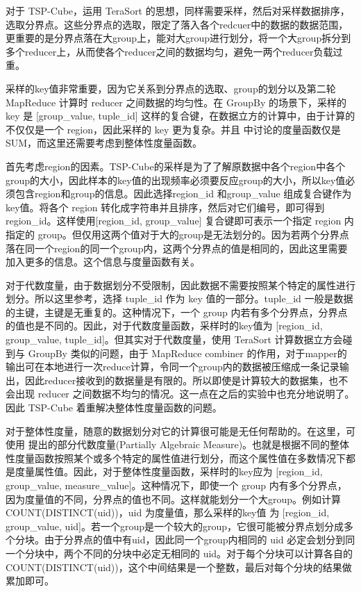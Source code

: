 对于 TSP-Cube，运用 TeraSort 的思想，同样需要采样，然后对采样数据排序，选取分界点。这些分界点的选取，限定了落入各个redcuer中的数据的数据范围，更重要的是分界点落在大group上，能对大group进行划分，将一个大group拆分到多个reducer上，从而使各个reducer之间的数据均匀，避免一两个reducer负载过重。

采样的key值非常重要，因为它关系到分界点的选取、group的划分以及第二轮 MapReduce 计算时 reducer 之间数据的均匀性。在 GroupBy 的场景下，采样的 key 是 [group\_value, tuple\_id] 这样的复合键，在数据立方的计算中，由于计算的不仅仅是一个 region，因此采样的 key 更为复杂。并且\cite{tao2013minimal} 中讨论的度量函数仅是 SUM，而这里还需要考虑到整体性度量函数。

首先考虑region的因素。TSP-Cube的采样是为了了解原数据中各个region中各个group的大小，因此样本的key值的出现频率必须要反应group的大小，所以key值必须包含region和group的信息。因此选择region\_id 和group\_value 组成复合键作为key值。将各个 region 转化成字符串并且排序，然后对它们编号，即可得到 region\_id。这样使用[region\_id, group\_value] 复合键即可表示一个指定 region 内指定的 group。但仅用这两个值对于大的group是无法划分的。因为若两个分界点落在同一个region的同一个group内，这两个分界点的值是相同的，因此这里需要加入更多的信息。这个信息与度量函数有关。

对于代数度量，由于数据划分不受限制，因此数据不需要按照某个特定的属性进行划分。所以这里参考\cite{tao2013minimal}，选择 tuple\_id 作为 key 值的一部分。tuple\_id 一般是数据的主键，主键是无重复的。这种情况下，一个 group 内若有多个分界点，分界点的值也是不同的。因此，对于代数度量函数，采样时的key值为 [region\_id, group\_value, tuple\_id]。但其实对于代数度量，使用 TeraSort 计算数据立方会碰到与 GroupBy 类似的问题，由于 MapReduce combiner 的作用，对于mapper的输出可在本地进行一次reduce计算，令同一个group内的数据被压缩成一条记录输出，因此reducer接收到的数据量是有限的。所以即使是计算较大的数据集，也不会出现 reducer 之间数据不均匀的情况。这一点在之后的实验中也充分地说明了。因此 TSP-Cube 着重解决整体性度量函数的问题。

对于整体性度量，随意的数据划分对它的计算很可能是无任何帮助的。在这里，可使用 \cite{nandi2011distributed} 提出的部分代数度量(Partially Algebraic Measure)。也就是根据不同的整体性度量函数按照某个或多个特定的属性值进行划分，而这个属性值在多数情况下都是度量属性值。因此，对于整体性度量函数，采样时的key应为 [region\_id, group\_value, measure\_value]。这种情况下，即使一个 group 内有多个分界点，因为度量值的不同，分界点的值也不同。这样就能划分一个大group。例如计算 COUNT(DISTINCT(uid))，uid 为度量值，那么采样的key值	为 [region\_id, group\_value, uid]。若一个group是一个较大的group，它很可能被分界点划分成多个分块。由于分界点的值中有uid，因此同一个group内相同的 uid 必定会划分到同一个分块中，两个不同的分块中必定无相同的 uid。对于每个分块可以计算各自的 COUNT(DISTINCT(uid))，这个中间结果是一个整数，最后对每个分块的结果做累加即可。

